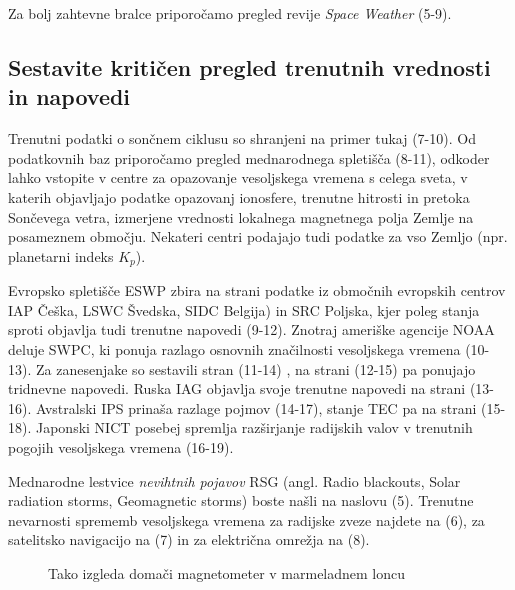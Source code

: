  
Za bolj zahtevne bralce priporočamo pregled revije \textit{Space Weather} (5-9).

\subsection{Sestavite kritičen pregled trenutnih vrednosti in napovedi}
\label{subsec:VesVrem_Podat}
Trenutni podatki o sončnem ciklusu so shranjeni na primer tukaj (7-10). Od podatkovnih baz priporočamo pregled mednarodnega spletišča (8-11), odkoder lahko vstopite v centre za opazovanje vesoljskega vremena s celega sveta, v katerih objavljajo podatke opazovanj ionosfere, trenutne hitrosti in pretoka Sončevega vetra, izmerjene vrednosti lokalnega magnetnega polja Zemlje na posameznem območju. Nekateri centri podajajo tudi podatke za vso Zemljo (npr. planetarni indeks $K_p$).

Evropsko spletišče ESWP zbira na strani podatke iz območnih evropskih centrov IAP Češka, LSWC Švedska, SIDC Belgija) in SRC Poljska, kjer poleg stanja sproti objavlja tudi trenutne napovedi (9-12). Znotraj ameriške agencije NOAA deluje SWPC, ki ponuja razlago osnovnih značilnosti vesoljskega vremena (10-13). Za zanesenjake so sestavili stran (11-14) , na strani (12-15) pa ponujajo tridnevne napovedi. Ruska IAG objavlja svoje trenutne napovedi na strani (13-16). Avstralski IPS prinaša razlage pojmov (14-17), stanje TEC pa na strani (15-18). Japonski NICT posebej spremlja razširjanje radijskih valov v trenutnih pogojih vesoljskega vremena (16-19).

Mednarodne lestvice \textit{nevihtnih pojavov} RSG (angl. Radio blackouts, Solar radiation storms, Geomagnetic storms) boste našli na naslovu (5). 
Trenutne nevarnosti sprememb vesoljskega vremena za radijske zveze najdete na (6), za satelitsko navigacijo na (7) in za električna omrežja na (8).

\begin{figure}
	\centering
	\caption{Tako izgleda domači magnetometer v marmeladnem loncu}
	\label{fig:VesVr_Eksp}       %
\end{figure}
 
